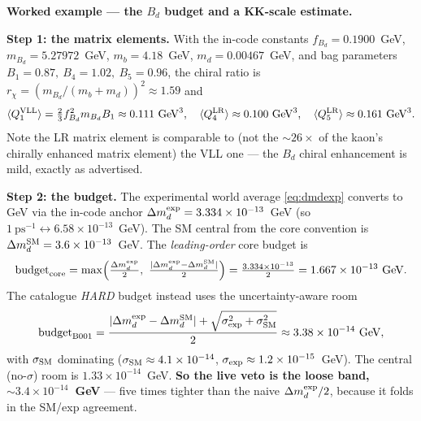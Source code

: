 \documentclass[11pt]{article}
\newenvironment{callout}[1]{%
  \par\medskip\begin{shaded}\noindent\textbf{#1}\par\smallskip}{\end{shaded}\medskip}
\newcommand{\dmd}{\Delta m_d}
\theoremstyle{definition}
\begin{document}
\begin{callout}{Worked example --- the $B_d$ budget and a KK-scale estimate.}
\textbf{Step 1: the matrix elements.} With the in-code constants
$f_{B_d}=0.1900$~GeV, $m_{B_d}=5.27972$~GeV, $m_b=4.18$~GeV,
$m_d=0.00467$~GeV, and bag parameters $B_1=0.87,\ B_4=1.02,\ B_5=0.96$, the chiral
ratio is $r_\chi=(m_{B_d}/(m_b+m_d))^2\approx1.59$ and
\[
\langle Q_1^{\rm VLL}\rangle = \tfrac23 f_{B_d}^2 m_{B_d} B_1 \approx 0.111~\text{GeV}^3,
\quad
\langle Q_4^{\rm LR}\rangle \approx 0.100~\text{GeV}^3,
\quad
\langle Q_5^{\rm LR}\rangle \approx 0.161~\text{GeV}^3.
\]
Note the LR matrix element is comparable to (not the $\sim$$26\times$ of the
kaon's chirally enhanced matrix element) the VLL one --- the
$B_d$ chiral enhancement is mild, exactly as advertised.

\textbf{Step 2: the budget.} The experimental world average
\eqref{eq:dmdexp} converts to GeV via the in-code anchor
$\dmd^{\rm exp}=3.334\times10^{-13}$~GeV (so
$1~\text{ps}^{-1}\leftrightarrow6.58\times10^{-13}$~GeV). The SM central from the
core convention is $\dmd^{\rm SM}=3.6\times10^{-13}$~GeV. The
\emph{leading-order} core budget is
\[
\text{budget}_{\rm core}=\max\!\Big(\tfrac{\dmd^{\rm exp}}{2},\
\tfrac{|\dmd^{\rm exp}-\dmd^{\rm SM}|}{2}\Big)
=\tfrac{3.334\times10^{-13}}{2}=1.667\times10^{-13}~\text{GeV}.
\]
The catalogue \emph{HARD} budget instead uses the uncertainty-aware room
\[
\text{budget}_{\rm B001}=\frac{|\dmd^{\rm exp}-\dmd^{\rm SM}|+\sqrt{\sigma_{\rm exp}^2+\sigma_{\rm SM}^2}}{2}
\approx 3.38\times10^{-14}~\text{GeV},
\]
with $\sigma_{\rm SM}$ dominating ($\sigma_{\rm SM}\approx4.1\times10^{-14}$,
$\sigma_{\rm exp}\approx1.2\times10^{-15}$~GeV). The central (no-$\sigma$) room is
$1.33\times10^{-14}$~GeV. \textbf{So the live veto is the loose band,
$\sim3.4\times10^{-14}$~GeV} --- five times tighter than the naive
$\dmd^{\rm exp}/2$, because it folds in the SM/exp agreement.


\end{callout}
\end{document}
